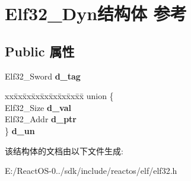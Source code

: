 \hypertarget{struct_elf32___dyn}{}\section{Elf32\+\_\+\+Dyn结构体 参考}
\label{struct_elf32___dyn}
\subsection*{Public 属性}
\begin{DoxyCompactItemize}
\item 
\mbox{\label{struct_elf32___dyn_a0edbe45a1c49cbb352dc3e1937369180}} 
Elf32\+\_\+\+Sword {\bfseries d\+\_\+tag}
\item 
\mbox{\label{struct_elf32___dyn_a0af8f5af74458b81f67ca8a59d84f083}} 
\begin{tabbing}
xx\=xx\=xx\=xx\=xx\=xx\=xx\=xx\=xx\=\kill
union \{\\
\>Elf32\_Size {\bfseries d\_val}\\
\>Elf32\_Addr {\bfseries d\_ptr}\\
\} {\bfseries d\_un}\\

\end{tabbing}\end{DoxyCompactItemize}


该结构体的文档由以下文件生成\+:\begin{DoxyCompactItemize}
\item 
E\+:/\+React\+O\+S-\/0../sdk/include/reactos/elf/elf32.\+h\end{DoxyCompactItemize}

